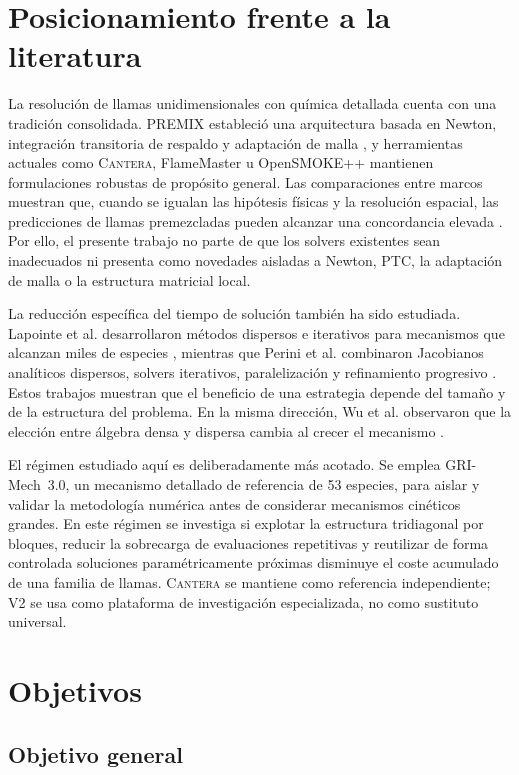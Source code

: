 \documentclass[12pt,a4paper,twoside,openany]{book}
\newcommand{\Vdos}{\textsc{V2}\xspace}
\newcommand{\Cantera}{\textsc{Cantera}\xspace}
\begin{document}
\section{Posicionamiento frente a la literatura}

La resolución de llamas unidimensionales con química detallada cuenta con una
tradición consolidada. PREMIX estableció una arquitectura basada en Newton,
integración transitoria de respaldo y adaptación de malla
\cite{Grcar1988,KeePremix1998}, y herramientas actuales como \Cantera,
FlameMaster u OpenSMOKE++ mantienen formulaciones robustas de propósito general.
Las comparaciones entre marcos muestran que, cuando se igualan las hipótesis
físicas y la resolución espacial, las predicciones de llamas premezcladas pueden
alcanzar una concordancia elevada \cite{Langer2018}. Por ello, el presente
trabajo no parte de que los solvers existentes sean inadecuados ni presenta como
novedades aisladas a Newton, PTC, la adaptación de malla o la estructura
matricial local.

La reducción específica del tiempo de solución también ha sido estudiada.
Lapointe et al. desarrollaron métodos dispersos e iterativos para mecanismos que
alcanzan miles de especies \cite{Lapointe2019}, mientras que Perini et al.
combinaron Jacobianos analíticos dispersos, solvers iterativos, paralelización y
refinamiento progresivo \cite{Perini2025}. Estos trabajos muestran que el
beneficio de una estrategia depende del tamaño y de la estructura del problema.
En la misma dirección, Wu et al. observaron que la elección entre álgebra densa
y dispersa cambia al crecer el mecanismo \cite{Wu2023}.

El régimen estudiado aquí es deliberadamente más acotado. Se emplea GRI-Mech~3.0,
un mecanismo detallado de referencia de 53 especies, para aislar y validar la
metodología numérica antes de considerar mecanismos cinéticos grandes. En este
régimen se investiga si explotar la estructura tridiagonal por bloques, reducir
la sobrecarga de evaluaciones repetitivas y reutilizar de forma controlada
soluciones paramétricamente próximas disminuye el coste acumulado de una familia
de llamas. \Cantera se mantiene como referencia independiente; \Vdos se usa
como plataforma de investigación especializada, no como sustituto universal.

\section{Objetivos}

\subsection{Objetivo general}
\end{document}
